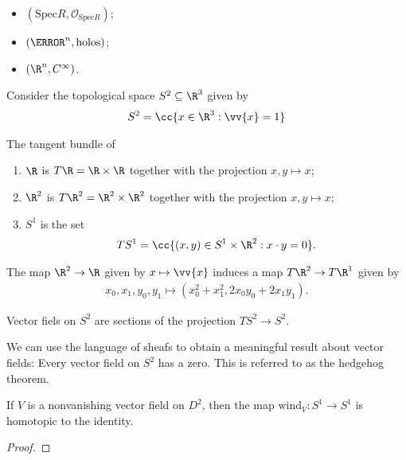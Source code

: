 \documentclass{article}
\begin{document}
\begin{example}
  \begin{itemize}
    \item $(\text{Spec} R,\mathcal O_{\text{Spec} R})$;
    \item $(\C^n, \text{holos})$;
    \item $(\R^n, C^\infty)$.
  \end{itemize}
\end{example}

\begin{definition}
  Consider the topological space $S^2\subseteq\R^3$ given by
  \begin{align*}
    S^2 = \cc{x \in \R^3 : \vv{x}=1}
  \end{align*}
\end{definition}

\begin{example}
  The tangent bundle of
  \begin{enumerate}
    \item $\R$ is $T\R=\R\times\R$ together with the projection $x,y\mapsto x$;
    \item $\R^2$ is $T\R^2 = \R^2\times\R^2$ together with the projection
      $x,y\mapsto x$;
    \item $S^1$ is the set
      \begin{align*}
        TS^1 = \cc{(x,y)\in S^1\times\R^2: x\cdot y = 0}.
      \end{align*}
  \end{enumerate}
\end{example}

The map $\R^2\to\R$ given by $x\mapsto\vv{x}$ induces a map
$T\R^2 \to T\R^1$ given by
\begin{align*}
  x_0,x_1,y_0,y_1\mapsto (x_0^2 + x_1^2, 2x_0y_0+2x_1y_1).
\end{align*}

\begin{definition}
  Vector fiels on $S^2$ are sections of the projection $TS^2\to S^2$.
\end{definition}

We can use the language of sheafs to obtain a meaningful result about
vector fields: Every vector field on $S^2$ has a zero. This is referred to
as the hedgehog theorem. 

\begin{lemma}
  If $V$ is a nonvanishing vector field on $D^2$, then the map
  $\text{wind}_V:S^1\to S^1$ is homotopic to the identity.
  \begin{proof}
    \missingproof
  \end{proof}
\end{lemma}
\end{document}
